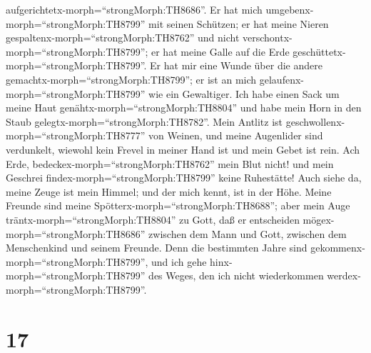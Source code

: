 aufgerichtetx-morph=``strongMorph:TH8686''.  Er hat mich
umgebenx-morph=``strongMorph:TH8799'' mit seinen Schützen; er hat meine
Nieren gespaltenx-morph=``strongMorph:TH8762'' und nicht
verschontx-morph=``strongMorph:TH8799''; er hat meine Galle auf die Erde
geschüttetx-morph=``strongMorph:TH8799''.  Er hat mir eine
Wunde über die andere gemachtx-morph=``strongMorph:TH8799''; er ist an
mich gelaufenx-morph=``strongMorph:TH8799'' wie ein Gewaltiger.
 Ich habe einen Sack um meine Haut
genähtx-morph=``strongMorph:TH8804'' und habe mein Horn in den Staub
gelegtx-morph=``strongMorph:TH8782''.  Mein Antlitz ist
geschwollenx-morph=``strongMorph:TH8777'' von Weinen, und meine
Augenlider sind verdunkelt,  wiewohl kein Frevel in meiner
Hand ist und mein Gebet ist rein.  Ach Erde,
bedeckex-morph=``strongMorph:TH8762'' mein Blut nicht! und mein Geschrei
findex-morph=``strongMorph:TH8799'' keine Ruhestätte!  Auch
siehe da, meine Zeuge ist mein Himmel; und der mich kennt, ist in der
Höhe.  Meine Freunde sind meine
Spötterx-morph=``strongMorph:TH8688''; aber mein Auge
träntx-morph=``strongMorph:TH8804'' zu Gott,  daß er
entscheiden mögex-morph=``strongMorph:TH8686'' zwischen dem Mann und
Gott, zwischen dem Menschenkind und seinem Freunde.  Denn
die bestimmten Jahre sind gekommenx-morph=``strongMorph:TH8799'', und
ich gehe hinx-morph=``strongMorph:TH8799'' des Weges, den ich nicht
wiederkommen werdex-morph=``strongMorph:TH8799''.

\hypertarget{section-16}{%
\section{17}\label{section-16}}

